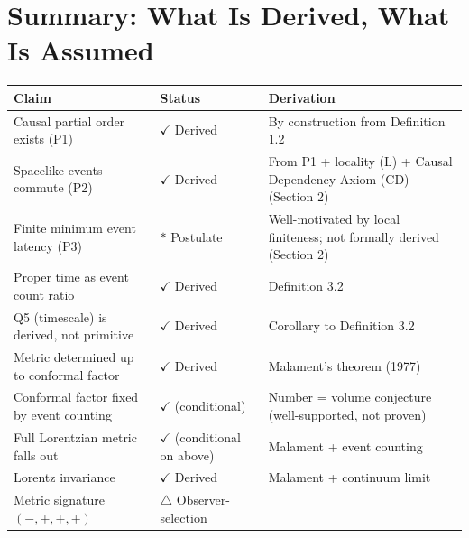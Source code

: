 \documentclass[11pt]{article}
\theoremstyle{definition}
\theoremstyle{remark}
\begin{document}
\medskip

\section{Summary: What Is Derived, What Is
Assumed}\label{summary-what-is-derived-what-is-assumed}

{\def\LTcaptype{none} %
\begin{longtable}[]{@{}
  >{\raggedright\arraybackslash}p{}
  >{\raggedright\arraybackslash}p{}
  >{\raggedright\arraybackslash}p{}@{}}
\toprule\noalign{}
\begin{minipage}[b]{\linewidth}\raggedright
Claim
\end{minipage} & \begin{minipage}[b]{\linewidth}\raggedright
Status
\end{minipage} & \begin{minipage}[b]{\linewidth}\raggedright
Derivation
\end{minipage} \\
\midrule\noalign{}
\endhead
\bottomrule\noalign{}
\endlastfoot
Causal partial order exists (P1) & \(\checkmark\) Derived & By
construction from Definition 1.2 \\
Spacelike events commute (P2) & \(\checkmark\) Derived & From P1 +
locality (L) + Causal Dependency Axiom (CD) (Section 2) \\
Finite minimum event latency (P3) & \(\ast\) Postulate & Well-motivated
by local finiteness; not formally derived (Section 2) \\
Proper time as event count ratio & \(\checkmark\) Derived & Definition
3.2 \\
Q5 (timescale) is derived, not primitive & \(\checkmark\) Derived &
Corollary to Definition 3.2 \\
Metric determined up to conformal factor & \(\checkmark\) Derived &
Malament's theorem (1977) \\
Conformal factor fixed by event counting & \(\checkmark\) (conditional)
& Number = volume conjecture (well-supported, not proven) \\
Full Lorentzian metric falls out & \(\checkmark\) (conditional on above)
& Malament + event counting \\
Lorentz invariance & \(\checkmark\) Derived & Malament + continuum
limit \\
Metric signature \((-,+,+,+)\) & \(\triangle\) Observer-selection

\end{longtable}}
\end{document}
